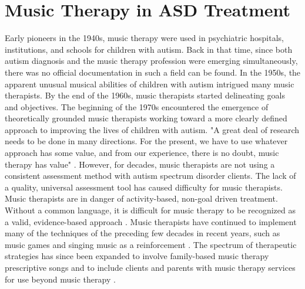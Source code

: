 \section{Music Therapy in ASD Treatment}
Early pioneers in the 1940s, music therapy were used in psychiatric hospitals, institutions, 
and schools for children with autism. Back in that time, since both autism diagnosis and 
the music therapy profession were emerging simultaneously, there was no official documentation
in such a field can be found. In the 1950s, the apparent unusual musical abilities of children with 
autism intrigued many music therapists. By the end of the 1960s, music therapists started delineating 
goals and objectives. The beginning of the 1970s encountered the emergence of theoretically 
grounded music therapists working toward a more clearly defined approach to improving the lives 
of children with autism. "A great deal of research needs to be done in many directions. For the 
present, we have to use whatever approach has some value, and from our experience, there is 
no doubt, music therapy has value" \cite{reschke2011history}. However, for decades, music therapists 
are not using a consistent assessment method with autism spectrum disorder clients. The lack of a 
quality, universal assessment tool has caused difficulty for music therapists. Music therapists are 
in danger of activity-based, non-goal driven treatment. Without a common language, it is difficult 
for music therapy to be recognized as a valid, evidence-based approach \cite{thaut2000scientific}. 
Music therapists have continued to implement many of the techniques of the preceding few decades in 
recent years, such as music games and singing music as a reinforcement \cite{starr1998understanding, dellatan2003use}. 
The spectrum of therapeutic strategies has since been expanded to involve family-based music 
therapy prescriptive songs and to include clients and parents with music therapy services 
for use beyond music therapy \cite{brownell2002musically, kern2006using, katagiri2009effect}.\\

